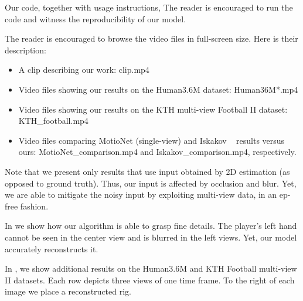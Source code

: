  \label{sec:code}
Our code, together with usage instructions, 
\fi
The reader is encouraged to run the code and witness the reproducibility of our model.

 \label{sec:media}


\fi %
The reader is encouraged to browse the video files in full-screen size. 
\fi%
Here is their description:

\begin{itemize}
    \item A clip describing our work: clip.mp4
    \item Video files showing our results on the Human3.6M dataset: Human36M*.mp4
    \item Video files showing our results on the KTH multi-view Football II dataset: KTH\_football.mp4
    \item Video files comparing MotioNet (single-view) and Iskakov \etal~\cite{iskakov2019learnable} results versus ours: MotioNet\_comparison.mp4 and Iskakov\_comparison.mp4, respectively. 
\end{itemize}

Note that we present only results that use input obtained by 2D estimation (as opposed to ground truth). Thus, our input is affected by occlusion and blur. Yet, we are able to mitigate the noisy input by exploiting multi-view data, in an ep-free fashion.


In  we show how our algorithm is able to grasp fine details. The player's left hand cannot be seen in the center view and is blurred in the left views. Yet, our model accurately reconstructs it.

In , we show additional results on the Human3.6M and KTH Football multi-view II datasets. Each row depicts three views of one time frame. To the right of each image we place a reconstructed rig. 
%
\fi

